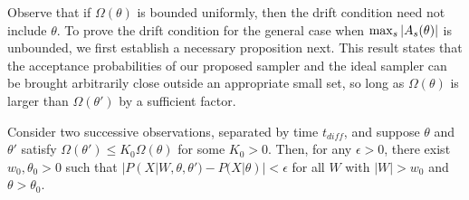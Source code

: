 \noindent Observe that if $\Omega(\theta)$ is bounded uniformly, then 
the drift condition need not include $\theta$. To prove the drift 
condition for the general case when ${\max_s |A_s(\theta)|}$ is unbounded,
we first establish a necessary proposition next.
This result states that the acceptance probabilities of our proposed
sampler and the ideal sampler can be brought arbitrarily close
outside an appropriate small set, so long as $\Omega(\theta)$ is larger
than $\Omega(\theta')$ by a sufficient factor. 

\begin{lemma}
Consider two successive observations, separated by time $t_{diff}$, and 
suppose $\theta$ and $\theta'$ satisfy $\Omega(\theta') \leq K_0 
\Omega(\theta)$ for some $K_0 > 0$. Then, 
for any $\epsilon > 0$, there exist  $w_0, \theta_0 > 0$ such that 
$|P(X| W, \theta, \theta') - P(X | \theta)| < \epsilon$
for all $W$ with $|W| > w_0$ and $\theta > \theta_0$.
\label{lem:eigenvalue_lemma}
\end{lemma}
